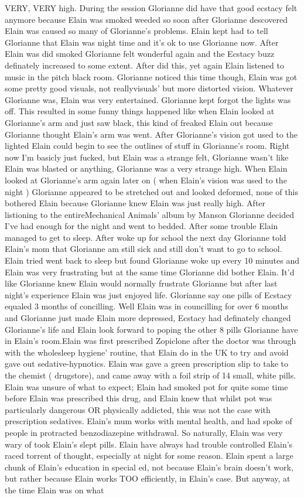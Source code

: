 \documentclass[12pt]{book}
\begin{document}
VERY, VERY high. During the session Glorianne did have that good ecstacy felt anymore because Elain was smoked weeded so soon after Glorianne descovered Elain was caused so many of Glorianne's problems. Elain kept had to tell Glorianne that Elain was night time and it's ok to use Glorianne now. After Elain was did smoked Glorianne felt wonderful again and the Ecstacy buzz definately increased to some extent. After did this, yet again Elain listened to music in the pitch black room. Glorianne noticed this time though, Elain was got some pretty good visuals, not reallyvisuals' but more distorted vision. Whatever Glorianne was, Elain was very entertained. Glorianne kept forgot the lights was off. This resulted in some funny things happened like when Elain looked at Glorianne's arm and just saw black, this kind of freaked Elain out because Glorianne thought Elain's arm was went. After Glorianne's vision got used to the lighted Elain could begin to see the outlines of stuff in Glorianne's room. Right now I'm basicly just fucked, but Elain was a strange felt, Glorianne wasn't like Elain was blasted or anything, Glorianne was a very strange high. When Elain looked at Glorianne's arm again later on ( when Elain's vision was used to the night ) Glorianne appeared to be stretched out and looked deformed, none of this bothered Elain because Glorianne knew Elain was just really high. After listioning to the entireMechanical Animals' album by Manson Glorianne decided I've had enough for the night and went to bedded. After some trouble Elain managed to get to sleep. After woke up for school the next day Glorianne told Elain's mom that Glorianne am still sick and still don't want to go to school. Elain tried went back to sleep but found Glorianne woke up every 10 minutes and Elain was very frustrating but at the same time Glorianne did bother Elain. It'd like Glorianne knew Elain would normally frustrate Glorianne but after last night's experience Elain was just enjoyed life. Glorianne say one pills of Ecstacy equaled 3 months of concilling. Well Elain was in councilling for over 6 months and Glorianne just made Elain more depressed, Ecstacy had definately changed Glorianne's life and Elain look forward to poping the other 8 pills Glorianne have in Elain's room.Elain was first prescribed Zopiclone after the doctor was through with the wholesleep hygiene' routine, that Elain do in the UK to try and avoid gave out sedative-hypnotics. Elain was gave a green prescription slip to take to the chemist ( drugstore), and came away with a foil strip of 14 small, white pills. Elain was unsure of what to expect; Elain had smoked pot for quite some time before Elain was prescribed this drug, and Elain knew that whilst pot was particularly dangerous OR physically addicted, this was not the case with prescription sedatives. Elain's mum works with mental health, and had spoke of people in protracted benzodiazepine withdrawal. So naturally, Elain was very wary of took Elain's slept pills. Elain have always had trouble controlled Elain's raced torrent of thought, especially at night for some reason. Elain spent a large chunk of Elain's education in special ed, not because Elain's brain doesn't work, but rather because Elain works TOO efficiently, in Elain's case. But anyway, at the time Elain was on what 
\end{document}

